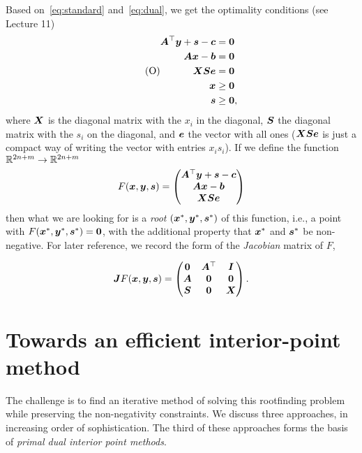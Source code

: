 Based on~\eqref{eq:standard} and~\eqref{eq:dual}, we get the optimality conditions (see Lecture 11)
\begin{align}\label{eq:opt2}\tag{O}
 \begin{split}
  \bm{A}^{\top}\bm{y}+\bm{s}-\bm{c} &= \bm{0}\\
  \bm{A}\bm{x}-\bm{b} & = \bm{0}\\
  \bm{X}\bm{S}\bm{e} &= \bm{0}\\
  \bm{x}&\geq \bm{0}\\
  \bm{s}&\geq \bm{0},
 \end{split}
\end{align}
where $\bm{X}$ is the diagonal matrix with the $x_i$ in the diagonal, $\bm{S}$ the diagonal matrix with the $s_i$ on the diagonal, and $\bm{e}$ the vector with all ones ($\bm{X}\bm{S}\bm{e}$ is just a compact way of writing the vector with entries $x_is_i$).
If we define the function $\mathbb{R}^{2n+m}\to \mathbb{R}^{2n+m}$
\begin{equation}\label{eq:F}
 F(\bm{x},\bm{y},\bm{s}) = \begin{pmatrix}
                               \bm{A}^{\top}\bm{y}+\bm{s}-\bm{c}\\
                               \bm{A}\bm{x}-\bm{b}\\
                               \bm{X}\bm{S}\bm{e} 
                              \end{pmatrix}
\end{equation}
then what we are looking for is a {\em root} $(\bm{x}^*,\bm{y}^*,\bm{s}^*)$ of this function, i.e., a point with $F(\bm{x}^*,\bm{y}^*,\bm{s}^*)=\bm{0}$, with the additional property that $\bm{x}^*$ and $\bm{s}^*$ be non-negative. For later reference, we record the form of the {\em Jacobian} matrix of $F$,

\begin{equation*}
 \bm{J}F(\bm{x},\bm{y},\bm{s}) = \begin{pmatrix}
\bm{0} & \bm{A}^{\top} & \bm{I} \\
  \bm{A} & \bm{0} & \bm{0} \\
  \bm{S} & \bm{0} & \bm{X}
 \end{pmatrix}.
\end{equation*}

\section{Towards an efficient interior-point method}
The challenge is to find an iterative method of solving this rootfinding problem while preserving the non-negativity constraints. We discuss three approaches, in increasing order of sophistication. The third of these approaches forms the basis of {\em primal dual interior point methods}. 

